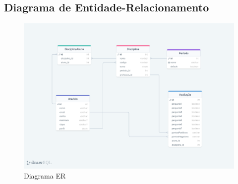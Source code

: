 \subsection{Diagrama de Entidade-Relacionamento}

\begin{figure}[h]
  \centering
  \includegraphics[width=1\textwidth]{imagens/diagrama-er.png}
  \caption{Diagrama ER}
  \label{fig:fig_diagrama_classe}
\end{figure}




%


